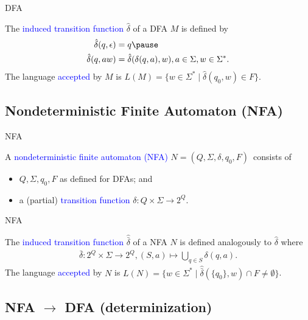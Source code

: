 \documentclass{beamer}
\def\b{\textcolor{blue}}
\begin{document}
\begin{frame}{DFA}
    \begin{definition}
        The \b{induced transition function} $\hat{\delta}$ of a DFA $M$ is defined by\pause
        \begin{align*}
            \hat{\delta}(q, \epsilon) &= q\pause\\
            \hat{\delta}(q, aw) &= \hat{\delta}(\delta(q,a),w), a \in \Sigma, w \in \Sigma^*.
        \end{align*}\pause
        The language \b{accepted} by $M$ is $L(M) = \{w \in \Sigma^* \mid \hat{\delta}(q_0, w) \in F\}$.
    \end{definition}
\end{frame}

\subsection{Nondeterministic Finite Automaton (NFA)}

\begin{frame}{NFA}
    \begin{definition}
        A \b{nondeterministic finite automaton (NFA)} $N = (Q, \Sigma, \delta, q_0, F)$\pause\ consists of
        \begin{itemize}
            \item $Q, \Sigma, q_0, F$ as defined for DFAs\pause; and
            \item a (partial) \b{transition function} $\delta: Q \times \Sigma \to 2^Q$.
        \end{itemize}
    \end{definition}
\end{frame}

\begin{frame}{NFA}
    \begin{definition}
        The \b{induced transition function} $\hat{\bar{\delta}}$ of a NFA $N$ is defined analogously to $\hat{\delta}$ where\pause
        \begin{align*}
            \bar{\delta}: 2^Q \times \Sigma \to 2^Q, (S, a) \mapsto \bigcup_{q \in S} \delta(q, a).
        \end{align*}\pause
        The language \b{accepted} by $N$ is $L(N) = \{w \in \Sigma^* \mid \hat{\bar{\delta}}(\{q_0\}, w) \cap F \neq \emptyset\}$.
    \end{definition}
\end{frame}

\subsection{NFA $\to$ DFA (determinization)}
\end{document}
